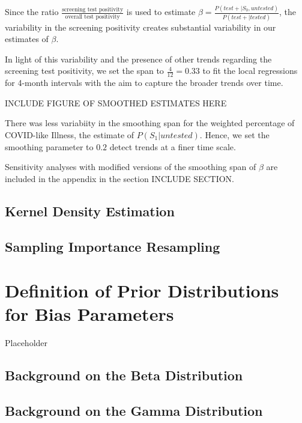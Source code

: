\documentclass[12pt,twoside]{smiththesis}
\begin{document}
Since the ratio \(\frac{\text{screening test positivity}}{\text{overall test positivity}}\) is used to estimate \(\beta = \frac{P(test + | S_0, untested)}{P(test + |tested)}\), the variability in the screening positivity creates substantial variability in our estimates of \(\beta\).

In light of this variability and the presence of other trends regarding the screening test positivity, we set the span to \(\frac{4}{12} = 0.33\) to fit the local regressions for 4-month intervals with the aim to capture the broader trends over time.

INCLUDE FIGURE OF SMOOTHED ESTIMATES HERE

There was less variabiity in the smoothing span for the weighted percentage of COVID-like Illness, the estimate of \(P(S_1|untested)\). Hence, we set the smoothing parameter to \(0.2\) detect trends at a finer time scale.

Sensitivity analyses with modified versions of the smoothing span of \(\beta\) are included in the appendix in the section INCLUDE SECTION.

\hypertarget{kernel-density-estimation}{%
\section{Kernel Density Estimation}\label{kernel-density-estimation}}

\hypertarget{sampling-importance-resampling}{%
\section{Sampling Importance Resampling}\label{sampling-importance-resampling}}

\hypertarget{definition-of-prior-distributions-for-bias-parameters}{%
\chapter{Definition of Prior Distributions for Bias Parameters}\label{definition-of-prior-distributions-for-bias-parameters}}

Placeholder

\hypertarget{background-on-the-beta-distribution}{%
\section{Background on the Beta Distribution}\label{background-on-the-beta-distribution}}

\hypertarget{background-on-the-gamma-distribution}{%
\section{Background on the Gamma Distribution}\label{background-on-the-gamma-distribution}}
\end{document}
